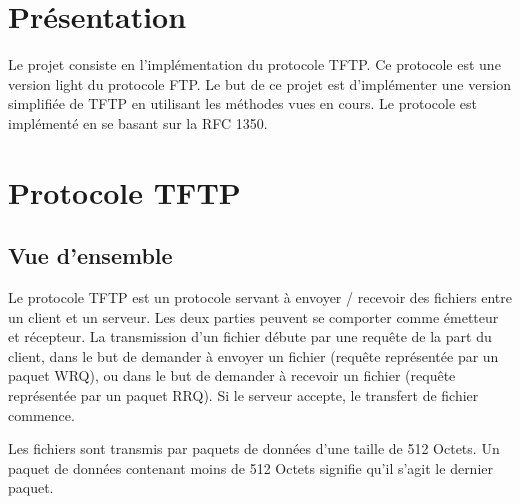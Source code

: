 \documentclass[11pt,a4paper]{article}
\title{\vartitle}
\author{\varauthor}
\date{\vardate}
\begin{document}
  \begin{titlepage}
    \maketitle

    \thispagestyle{empty}

    \begin{abstract}
    Ce rapport décrit l'implémentation du protocole TFTP dans le langage python. 
    \end{abstract}

    \vspace{1cm}

    \tableofcontents

  \end{titlepage}


  \newpage


  \section{Présentation}

  \par Le projet consiste en l’implémentation du protocole TFTP. Ce protocole est une version light du protocole FTP. Le but de ce projet est d’implémenter une version simplifiée de TFTP en utilisant les méthodes vues en cours. Le protocole est implémenté en se basant sur la RFC 1350.

  \section{Protocole TFTP}
  
  \subsection{Vue d'ensemble}
  
  \par Le protocole TFTP est un protocole servant à envoyer / recevoir des fichiers entre un client et un serveur. Les deux parties peuvent se comporter comme émetteur et récepteur. La transmission d'un fichier débute par une requête de la part du client, dans le but de demander à envoyer un fichier (requête représentée par un paquet WRQ), ou dans le but de demander à recevoir un fichier (requête représentée par un paquet RRQ). Si le serveur accepte, le transfert de fichier commence. 
  
  \par Les fichiers sont transmis par paquets de données d'une taille de 512 Octets. Un paquet de données contenant moins de 512 Octets signifie qu'il s'agit le dernier paquet.
  
\end{document}
